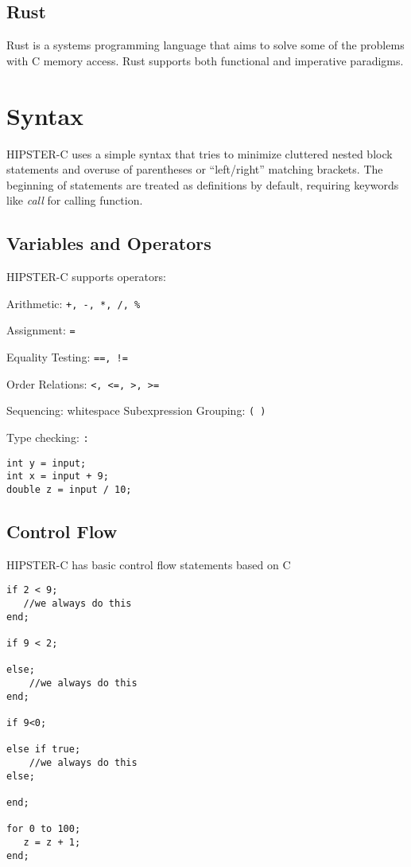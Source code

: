 \documentclass{article}
\begin{document}
\subsection{Rust}
Rust is a systems programming language that aims to solve some of the problems with C memory access. Rust supports both functional and imperative paradigms.




\section{Syntax}
HIPSTER-C uses a simple syntax that tries to minimize cluttered nested block statements and overuse of parentheses or ``left/right'' matching brackets. The beginning of statements are treated as definitions by default, requiring keywords like \textit{call} for calling function.  


\subsection{Variables and Operators}
HIPSTER-C supports operators:\par
Arithmetic: \texttt{+, -, *, /, \%}\par 
Assignment: \texttt{=}\par
Equality Testing: \texttt{==, !=}\par
Order Relations: \texttt{<, <=, >, >=}\par
Sequencing: whitespace
Subexpression Grouping: \texttt{( )}\par
Type checking: \texttt{:}


\begin{verbatim}
int y = input;
int x = input + 9;
double z = input / 10;
\end{verbatim}


\subsection{Control Flow}
HIPSTER-C has basic control flow statements based on C

\begin{verbatim}
if 2 < 9;
   //we always do this
end; 

if 9 < 2;

else;
    //we always do this
end;

if 9<0;

else if true;
    //we always do this
else;

end; 

for 0 to 100;
   z = z + 1;
end;

\end{verbatim}
\end{document}
